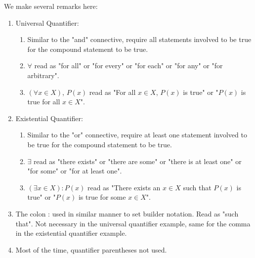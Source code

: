 \begin{remark}
    We make several remarks here:

    \begin{enumerate}
        \item Universal Quantifier:
            \begin{enumerate}[label=(\alph*)]
                \item Similar to the "and" connective, require all statements involved to be true for the compound statement to be true.
                \item $\forall$ read as "for all" or "for every" or "for each" or "for any" or "for arbitrary".
                \item $(\forall x \in X)$, $P(x)$ read as "For all $x \in X$, $P(x)$ is true" or "$P(x)$ is true for all $x \in X$".
            \end{enumerate}
        \item Existential Quantifier:
            \begin{enumerate}[label=(\alph*)]
                \item Similar to the "or" connective, require at least one statement involved to be true for the compound statement to be true.
                \item $\exists$ read as "there exists" or "there are some" or "there is at least one" or "for some" or "for at least one".
                \item $(\exists x \in X): P(x)$ read as "There exists an $x \in X$ such that $P(x)$ is true" or "$P(x)$ is true for some $x \in X$".
            \end{enumerate}
        \item The colon : used in similar manner to set builder notation. Read as "such that". Not necessary in the universal quantifier example, same for the comma in the existential quantifier example.
        \item Most of the time, quantifier parentheses not used.
    \end{enumerate}
\end{remark}

